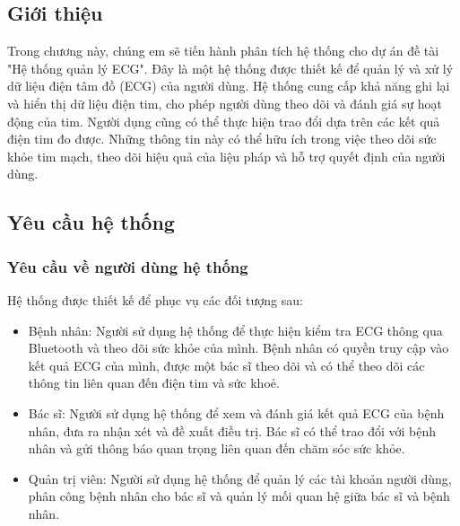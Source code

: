 \documentclass{article}%
\begin{document}
\subsection{Giới thiệu}
Trong chương này, chúng em sẽ tiến hành phân tích hệ thống cho dự án đề tài "Hệ thống quản lý ECG". Đây là một hệ thống được thiết kế để quản lý và xử lý dữ liệu điện tâm đồ (ECG) của người dùng. Hệ thống cung cấp khả năng ghi lại và hiển thị dữ liệu điện tim, cho phép người dùng theo dõi và đánh giá sự hoạt động của tim. Người dụng cũng có thể thực hiện trao đổi dựa trên các kết quả điện tim đo được. Những thông tin này có thể hữu ích trong việc theo dõi sức khỏe tim mạch, theo dõi hiệu quả của liệu pháp và hỗ trợ quyết định của người dùng.

\subsection{Yêu cầu hệ thống}
\subsubsection{Yêu cầu về người dùng hệ thống}
Hệ thống được thiết kế để phục vụ các đối tượng sau:
\begin{itemize}
    \item Bệnh nhân: Người sử dụng hệ thống để thực hiện kiểm tra ECG thông qua Bluetooth và theo dõi sức khỏe của mình. Bệnh nhân có quyền truy cập vào kết quả ECG của mình, được một bác sĩ theo dõi và có thể theo dõi các thông tin liên quan đến điện tim và sức khoẻ.
    \item Bác sĩ: Người sử dụng hệ thống để xem và đánh giá kết quả ECG của bệnh nhân, đưa ra nhận xét và đề xuất điều trị. Bác sĩ có thể trao đổi với bệnh nhân và gửi thông báo quan trọng liên quan đến chăm sóc sức khỏe.
    \item Quản trị viên: Người sử dụng hệ thống để quản lý các tài khoản người dùng, phân công bệnh nhân cho bác sĩ và quản lý mối quan hệ giữa bác sĩ và bệnh nhân.
\end{itemize}
\end{document}
